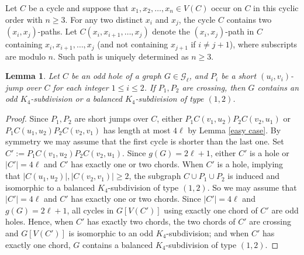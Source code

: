 \documentclass[11pt]{article}
\newtheorem{lemma}[theorem]{Lemma}
\begin{document}
Let $C$ be a cycle and suppose that $x_1,x_2,\ldots,x_n\in V(C)$ occur on $C$ in this cyclic order with $n\geq3$. For any two distinct $x_i$ and $x_j$, the cycle $C$ contains two $(x_i,x_j)$-paths. Let $C(x_i,x_{i+1},\ldots, x_j)$ denote the $(x_i,x_j)$-path in $C$ containing $x_i,x_{i+1},\ldots, x_j$ (and not containing $x_{j+1}$ if $i \neq j+1$), where subscripts are modulo $n$. Such path is uniquely determined as $n \geq 3$.

\begin{lemma}\label{cross short jump}
Let $C$ be an odd hole of a graph $G\in \mathcal{G}_{\ell}$, and $P_i$ be a short $(u_i,v_i)$-jump over $C$ for each integer $1\leq i\leq 2$. If $P_1,P_2$ are crossing, then $G$ contains an odd $K_4$-subdivision or a balanced $K_4$-subdivision of type $(1,2)$.
\end{lemma}
\begin{proof}
Since $P_1,P_2$ are short jumps over $C$, either $P_1C(v_1,u_2)P_2C(v_2,u_1)$ or $P_1C(u_1,u_2)P_2C(v_2,v_1)$ has length at most $4\ell$ by Lemma \ref{easy case}. By symmetry we may assume that the first cycle is shorter than the last one. Set $C':=P_1C(v_1,u_2)P_2C(v_2,u_1)$. Since $g(G)=2\ell+1$, either $C'$ is a hole or $|C'|=4\ell$ and $C'$ has exactly one or two chords. When $C'$ is a hole, implying that $|C(u_1,u_2)|, |C(v_2,v_1)|\geq2$, the subgraph  $C\cup P_1\cup P_2$ is induced and isomorphic to a balanced $K_4$-subdivision of type $(1,2)$. So we may assume that $|C'|=4\ell$ and $C'$ has exactly one or two chords. Since $|C'|=4\ell$ and $g(G)=2\ell+1$, all cycles in $G[V(C')]$ using exactly one chord of $C'$ are odd holes. Hence, when $C'$ has exactly two chords, the two chords of $C'$ are crossing and $G[V(C')]$ is isomorphic to an odd $K_4$-subdivision; and when $C'$ has exactly one chord, $G$ contains a balanced $K_4$-subdivision of type $(1,2)$.
\end{proof}
\end{document}
